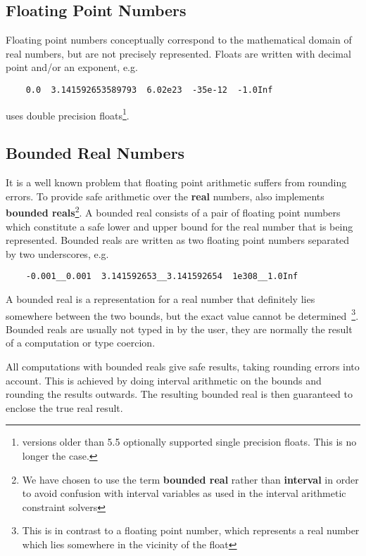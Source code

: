 \subsection{Floating Point Numbers}
Floating point numbers conceptually correspond to the mathematical
domain of real numbers, but are not precisely represented.
Floats are written with decimal point and/or an exponent, e.g.
\begin{verbatim}
	0.0  3.141592653589793  6.02e23  -35e-12  -1.0Inf
\end{verbatim}
{\eclipse} uses double precision floats\footnote{
{\eclipse} versions older than 5.5 optionally supported single precision
floats. This is no longer the case.}.


\subsection{Bounded Real Numbers}
It is a well known problem that floating point arithmetic suffers
from rounding errors.
To provide safe arithmetic over the {\bf real} numbers, {\eclipse}
also implements {\bf bounded reals}\footnote{
We have chosen to use the term {\bf bounded real} rather than
{\bf interval} in order to avoid confusion with interval variables
as used in the interval arithmetic constraint solvers}.
A bounded real consists of a pair of floating point numbers
which constitute a safe lower and upper bound for the real number that
is being represented. Bounded reals are written as two floating point
numbers separated by two underscores, e.g.
\begin{verbatim}
	-0.001__0.001  3.141592653__3.141592654  1e308__1.0Inf
\end{verbatim}
A bounded real is a representation for a real number that definitely lies
somewhere between the two bounds, but the exact value cannot be determined\
\footnote{This is in contrast to a floating point number, which represents
a real number which lies somewhere in the vicinity of the float}.
Bounded reals are usually not typed in by the user, they are normally
the result of a computation or type coercion.

All computations with bounded reals give safe results, taking rounding
errors into account. This is achieved by doing interval arithmetic
\index{interval arithmetic}
on the bounds and rounding the results outwards. The resulting
bounded real is then guaranteed to enclose the true real result.

